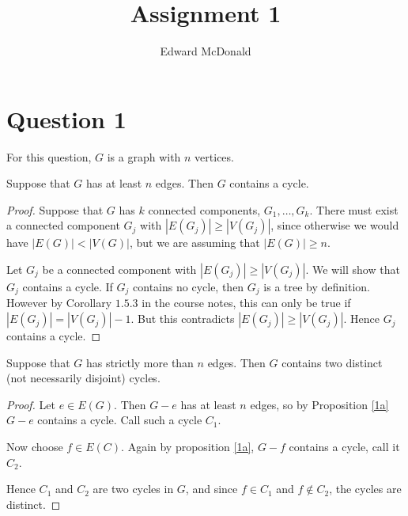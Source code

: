 \documentclass{unswmaths}
\begin{document}
\subject{MATH5425 - Graph Theory}
\author{Edward McDonald}
\title{Assignment 1}


\setlength\parindent{0pt}


\newcommand{\bd}{\boldsymbol{d}}

\unswtitle{}

\section{Question 1}
For this question, $G$ is a graph with $n$ vertices.
\begin{proposition}
\label{1a}
    Suppose that $G$ has at least $n$ edges. Then $G$ contains a cycle.
\end{proposition}
\begin{proof}
    Suppose that $G$ has $k$ connected components, $G_1,\ldots,G_k$.
    There must exist a connected component $G_j$
    with $|E(G_j)| \geq |V(G_j)|$, since otherwise we
    would have $|E(G)| < |V(G)|$, but we are assuming
    that $|E(G)| \geq n$. 
    
    Let $G_j$ be a connected component with $|E(G_j)| \geq |V(G_j)|$.
    We will show that $G_j$ contains a cycle. If $G_j$ contains
    no cycle, then $G_j$ is a tree by definition. However by Corollary
    $1.5.3$ in the course notes, this can only be true if $|E(G_j)| = |V(G_j)|-1$.
    But this contradicts $|E(G_j)| \geq |V(G_j)|$. Hence $G_j$ contains a cycle.
\end{proof}

\begin{proposition}
\label{1b}
    Suppose that $G$ has strictly more than $n$ edges. Then $G$ contains
    two distinct (not necessarily disjoint) cycles.
\end{proposition}
\begin{proof}
    Let $e \in E(G)$. Then $G - e$ has at least $n$ edges, so by Proposition \ref{1a}
    $G-e$ contains a cycle. Call such a cycle $C_1$.
    
    Now choose $f \in E(C)$. Again by proposition \ref{1a}, $G-f$ contains
    a cycle, call it $C_2$.
    
    Hence $C_1$ and $C_2$ are two cycles in $G$, and since $f \in C_1$
    and $f \notin C_2$, the cycles are distinct.
\end{proof}
\end{document}
